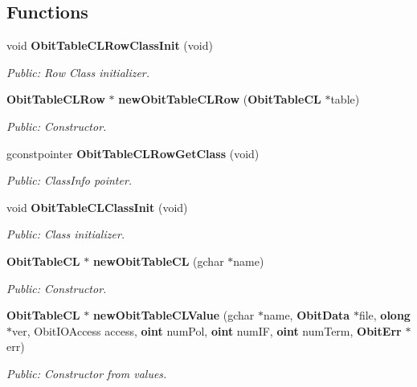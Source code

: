 \subsection*{Functions}
\begin{CompactItemize}
\item 
void {\bf Obit\-Table\-CLRow\-Class\-Init} (void)
\begin{CompactList}\small\item\em Public: Row Class initializer. \item\end{CompactList}\item 
{\bf Obit\-Table\-CLRow} $\ast$ {\bf new\-Obit\-Table\-CLRow} ({\bf Obit\-Table\-CL} $\ast$table)
\begin{CompactList}\small\item\em Public: Constructor. \item\end{CompactList}\item 
gconstpointer {\bf Obit\-Table\-CLRow\-Get\-Class} (void)
\begin{CompactList}\small\item\em Public: Class\-Info pointer. \item\end{CompactList}\item 
void {\bf Obit\-Table\-CLClass\-Init} (void)
\begin{CompactList}\small\item\em Public: Class initializer. \item\end{CompactList}\item 
{\bf Obit\-Table\-CL} $\ast$ {\bf new\-Obit\-Table\-CL} (gchar $\ast$name)
\begin{CompactList}\small\item\em Public: Constructor. \item\end{CompactList}\item 
{\bf Obit\-Table\-CL} $\ast$ {\bf new\-Obit\-Table\-CLValue} (gchar $\ast$name, {\bf Obit\-Data} $\ast$file, {\bf olong} $\ast$ver, Obit\-IOAccess access, {\bf oint} num\-Pol, {\bf oint} num\-IF, {\bf oint} num\-Term, {\bf Obit\-Err} $\ast$err)
\begin{CompactList}\small\item\em Public: Constructor from values. \item\end{CompactList}\item 

\end{CompactItemize}
